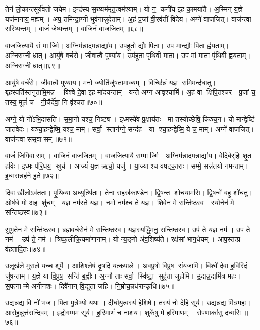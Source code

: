 तेन॑ लो॒कान्त्सूर्य॑वतो जयेम।
इन्द्र॑स्य स॒ख्यम॑मृत॒त्वम॑श्याम्।
यो न॒ कनी॑य इ॒ह का॒मया॑तै।
अ॒स्मिन् य॒ज्ञे यज॑मानाय॒ मह्यम्।
अप॒ तमि॑न्द्रा॒ग्नी भुव॑नान्नुदेताम्।
अ॒हं प्र॒जां वी॒रव॑तीं विदेय।
अग्ने॑ वाजजित्।
वाज॑न्त्वा सरि॒ष्यन्तम्।
वाजं॑ जे॒ष्यन्तम्।
वा॒जिनं॑ वाज॒जितम्॥६८॥

वा॒ज॒जि॒त्यायै॒ सं मार्ज्मि।
अ॒ग्निम॑न्ना॒दम॒न्नाद्या॑य।
उप॑हूतो॒ द्यौः पि॒ता।
उप॒ मान्द्यौः पि॒ता ह्व॑यताम्।
अ॒ग्निराग्नीध्रात्।
आयु॑षे॒ वर्च॑से।
जी॒वात्वै पुण्या॑य।
उप॑हूता पृथि॒वी मा॒ता।
उप॒ मां मा॒ता पृ॑थि॒वी ह्व॑यताम्।
अ॒ग्निराग्नीध्रात्॥६९॥

आयु॑षे॒ वर्च॑से।
जी॒वात्वै पुण्या॑य।
मनो॒ ज्योति॑र्जुषता॒माज्यम्।
विच्छि॑न्नं य॒ज्ञ समि॒मन्द॑धातु।
बृह॒स्पति॑स्तनुतामि॒मन्न॑।
विश्वे॑ दे॒वा इ॒ह मा॑दयन्ताम्।
यन्ते॑ अग्न आवृ॒श्चामि॑।
अ॒हं वा क्षिपि॒तश्चर\sn{}।
प्र॒जां च॒ तस्य॒ मूलं॑ च।
नी॒चैर्दे॑वा॒ नि वृ॑श्चत॥७०॥

अग्ने॒ यो नो॑ऽभि॒दास॑ति।
स॒मा॒नो यश्च॒ निष्ट्य॑।
इ॒ध्मस्ये॑व प्र॒क्षाय॑तः।
मा तस्योच्छे॑षि॒ किञ्च॒न।
यो मान्द्वेष्टि॑ जातवेदः।
यञ्चा॒हन्द्वेष्मि॒ यश्च॒ माम्।
सर्वा॒ स्तान॑ग्ने॒ सन्द॑ह।
या श्चा॒हन्द्वेष्मि॒ ये च॒ माम्।
अग्ने॑ वाजजित्।
वाज॑न्त्वा ससृ॒वासम्॥७१॥

वाजं॑ जिगि॒वासम्।
वा॒जिनं॑ वाज॒जितम्।
वा॒ज॒जि॒त्यायै॒ सम्मार्ज्मि।
अ॒ग्निम॑न्ना॒दम॒न्नाद्या॑य।
वेदि॑र्ब॒र्॒हिः शृ॒त ह॒विः।
इ॒ध्मः प॑रि॒धय॒ स्रुच॑।
आज्यं॑ य॒ज्ञ ऋचो॒ यजु॑।
या॒ज्याश्च वषट्का॒राः।
सम्मे॒ सन्न॑तयो नमन्ताम्।
इ॒ध्म॒स॒न्नह॑ने हु॒ते॥७२॥

दि॒वः खीलोऽव॑ततः।
पृ॒थि॒व्या अध्युत्थि॑तः।
तेना॑ स॒हस्र॑काण्डेन।
द्वि॒षन्त शोचयामसि।
द्वि॒षन्मे॑ ब॒हु शो॑चतु।
ओष॑धे॒ मो अ॒ह शु॑चम्।
यज्ञ॒ नम॑स्ते यज्ञ।
नमो॒ नम॑श्च ते यज्ञ।
शि॒वेन॑ मे॒ सन्ति॑ष्ठस्व।
स्यो॒नेन॑ मे॒ सन्ति॑ष्ठस्व॥७३॥

सु॒भू॒तेन॑ मे॒ सन्ति॑ष्ठस्व।
ब्र॒ह्म॒व॒र्च॒सेन॑ मे॒ सन्ति॑ष्ठस्व।
य॒ज्ञस्यर्द्धि॒मनु॒ सन्ति॑ष्ठस्व।
उप॑ ते यज्ञ॒ नम॑।
उप॑ ते॒ नम॑।
उप॑ ते॒ नम॑।
त्रिष्फ॒लीक्रि॒यमा॑णानाम्।
यो न्य॒ङ्गो अ॑व॒शिष्य॑ते।
रक्ष॑सां भाग॒धेयम्।
आप॒स्तत्प्र व॑हतादि॒तः॥७४॥

उ॒लूख॑ले॒ मुस॑ले॒ यच्च॒ शूर्पे।
आ॒शि॒श्लेष॑ दृ॒षदि॒ यत्क॒पाले।
अ॒व॒प्रुषो॑ वि॒प्रुष॒ संय॑जामि।
विश्वे॑ दे॒वा ह॒विरि॒दं जु॑षन्ताम्।
य॒ज्ञे या वि॒प्रुष॒ सन्ति॑ ब॒ह्वीः।
अ॒ग्नौ ताः सर्वा॒ स्वि॑ष्टा॒ सुहु॑ता जुहोमि।
उ॒द्यन्न॒द्यमि॑त्र महः।
स॒पत्नान्मे अनीनशः।
दिवै॑नान् वि॒द्युता॑ जहि।
नि॒म्रोच॒न्नध॑रान्कृधि॥७५॥

उ॒द्यन्न॒द्य वि नो॑ भज।
पि॒ता पु॒त्रेभ्यो॒ यथा।
दी॒र्घा॒यु॒त्वस्य॑ हेशिषे।
तस्य॑ नो देहि सूर्य।
उ॒द्यन्न॒द्य मि॑त्रमहः।
आ॒रोह॒न्नुत्त॑रा॒न्दिवम्।
हृ॒द्रो॒गम्मम॑ सूर्य।
ह॒रि॒माणं॑ च नाशय।
शुके॑षु मे हरि॒माणम्।
रो॒प॒णाका॑सु दध्मसि ॥७६॥

